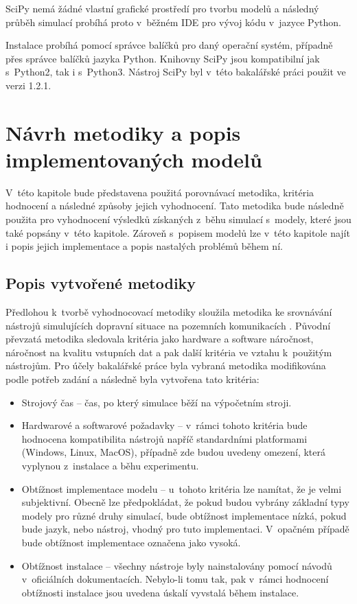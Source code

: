SciPy nemá žádné vlastní grafické prostředí pro tvorbu modelů a následný průběh simulací probíhá proto v~běžném IDE pro vývoj kódu v~jazyce Python. 

Instalace probíhá pomocí správce balíčků pro daný operační systém, případně přes správce balíčků jazyka Python. Knihovny SciPy jsou kompatibilní jak s~Python2, tak i s~Python3. Nástroj SciPy byl v~této bakalářské práci použit ve verzi 1.2.1.

\chapter{Návrh metodiky a popis implementovaných modelů}
\label{kapitola4}
V~této kapitole bude představena použitá porovnávací metodika, kritéria hodnocení a následné způsoby jejich vyhodnocení. Tato metodika bude následně použita pro vyhodnocení výsledků získaných z~běhu simulací s~modely, které jsou také popsány v~této kapitole. Zároveň s~popisem modelů lze v~této kapitole najít i popis jejich implementace a popis nastalých problémů během ní.

\section{Popis vytvořené metodiky}

Předlohou k~tvorbě vyhodnocovací metodiky sloužila metodika ke srovnávání nástrojů simulujících dopravní situace na pozemních komunikacích \cite{jones2004traffic}. Původní převzatá metodika sledovala kritéria jako hardware a software náročnost, náročnost na kvalitu vstupních dat a pak další kritéria ve vztahu k~použitým nástrojům. Pro účely bakalářské práce byla vybraná metodika modifikována podle potřeb zadání a následně byla vytvořena tato kritéria:
\begin{itemize}
    \item Strojový čas -- čas, po který simulace běží na výpočetním stroji.
    \item Hardwarové a softwarové požadavky -- v~rámci tohoto kritéria bude hodnocena kompatibilita nástrojů napříč standardními platformami (Windows, Linux, MacOS), případně zde budou uvedeny omezení, která vyplynou z~instalace a běhu experimentu.
    \item Obtížnost implementace modelu -- u~tohoto kritéria lze namítat, že je velmi subjektivní. Obecně lze předpokládat, že pokud budou vybrány základní typy modely pro různé druhy simulací, bude obtížnost implementace nízká, pokud bude jazyk, nebo nástroj, vhodný pro tuto implementaci. V~opačném případě bude obtížnost implementace označena jako vysoká.
    \item Obtížnost instalace -- všechny nástroje byly nainstalovány pomocí návodů v~oficiálních dokumentacích. Nebylo-li tomu tak, pak v~rámci hodnocení obtížnosti instalace jsou uvedena úskalí vyvstalá během instalace.
\end{itemize}

